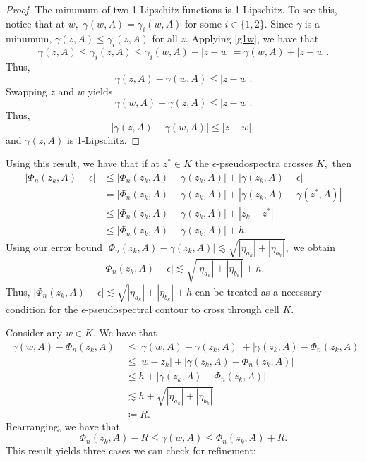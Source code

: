 \documentclass[12pt,a4paper]{article}
\theoremstyle{boldthm}
\theoremstyle{bolddefn}
\begin{document}
\begin{proof}
    The minumum of two 1-Lipschitz functions is 1-Lipschitz. To see this, notice that at $w,$ $\gamma(w, A) = \gamma_i(w, A)$ for some $i \in \{1, 2\}.$ Since $\gamma$ is a minumum, $\gamma(z, A) \le \gamma_i(z, A)$ for all $z.$ Applying \eqref{g1w}, we have that 
    \begin{equation}
        \gamma(z, A) \le \gamma_i(z, A) \le  \gamma_i(w,A) + |z-w| = \gamma(w, A) + |z-w|.
    \end{equation}
    Thus, 
        \begin{equation}
        \gamma(z, A) - \gamma(w, A) \le |z-w|.
    \end{equation}
    Swapping $z$ and $w$ yields 
        \begin{equation}
        \gamma(w, A) - \gamma(z, A) \le |z-w|.
    \end{equation}
    Thus,  
        \begin{equation}
        |\gamma(z, A) - \gamma(w, A)| \le |z-w|,
    \end{equation}
    and $\gamma(z, A)$ is 1-Lipschitz. 
\end{proof}


Using this result, we have that if at $z^* \in K$ the $\epsilon$-pseudospectra crosses $K,$ then
\begin{align}
    |\Phi_n(z_k, A) - \epsilon| &\le |\Phi_n(z_k, A) - \gamma(z_k, A)| + |\gamma(z_k, A) - \epsilon |\\
    &= |\Phi_n(z_k, A) - \gamma(z_k, A)| + |\gamma(z_k, A) - \gamma(z^*, A) | \\
    &\le |\Phi_n(z_k, A) - \gamma(z_k, A)| + |z_k - z^*| \\
    &\le |\Phi_n(z_k, A) - \gamma(z_k, A)| + h.
\end{align}
Using our error bound $|\Phi_n(z_k, A) - \gamma(z_k, A)| \lesssim \sqrt{|\eta_{a_k}| + |\eta_{b_k}|} ,$ we obtain
\begin{equation}
    |\Phi_n(z_k, A) - \epsilon| \lesssim \sqrt{|\eta_{a_k}| + |\eta_{b_k}|} + h.
\end{equation}
Thus, $|\Phi_n(z_k, A) - \epsilon| \lesssim \sqrt{|\eta_{a_k}| + |\eta_{b_k}|} + h $ can be treated as a necessary condition for the $\epsilon$-pseudospectral contour to cross through cell $K.$

Consider any $w \in K.$ We have that
\begin{align}
    | \gamma(w, A) - \Phi_n(z_k, A)| &\le |\gamma(w, A) - \gamma(z_k, A) | + | \gamma(z_k, A) - \Phi_n(z_k, A) |\\
    & \le |w-z_k| + | \gamma(z_k, A) - \Phi_n(z_k, A) | \\
    &\le h + | \gamma(z_k, A) - \Phi_n(z_k, A) |\\
    & \lesssim h + \sqrt{|\eta_{a_k}| + |\eta_{b_k}|} \\ &\coloneqq R.
\end{align}
Rearranging, we have that
\begin{equation}
    \Phi_n(z_k, A) - R \le \gamma(w, A) \le \Phi_n(z_k, A) + R.
\end{equation}
This result yields three cases we can check for refinement:
\end{document}
